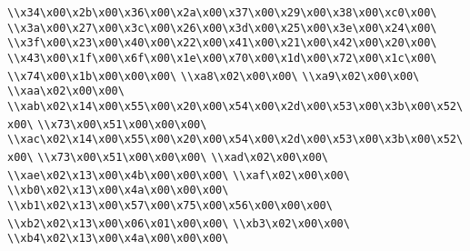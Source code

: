 \verb|\\x34\x00\x2b\x00\x36\x00\x2a\x00\x37\x00\x29\x00\x38\x00\xc0\x00\|\newline
\verb|\\x3a\x00\x27\x00\x3c\x00\x26\x00\x3d\x00\x25\x00\x3e\x00\x24\x00\|\newline
\verb|\\x3f\x00\x23\x00\x40\x00\x22\x00\x41\x00\x21\x00\x42\x00\x20\x00\|\newline
\verb|\\x43\x00\x1f\x00\x6f\x00\x1e\x00\x70\x00\x1d\x00\x72\x00\x1c\x00\|\newline
\verb|\\x74\x00\x1b\x00\x00\x00\|\newline
\verb|\\xa8\x02\x00\x00\|\newline
\verb|\\xa9\x02\x00\x00\|\newline
\verb|\\xaa\x02\x00\x00\|\newline
\verb|\\xab\x02\x14\x00\x55\x00\x20\x00\x54\x00\x2d\x00\x53\x00\x3b\x00\x52\x00\|\newline
\verb|\\x73\x00\x51\x00\x00\x00\|\newline
\verb|\\xac\x02\x14\x00\x55\x00\x20\x00\x54\x00\x2d\x00\x53\x00\x3b\x00\x52\x00\|\newline
\verb|\\x73\x00\x51\x00\x00\x00\|\newline
\verb|\\xad\x02\x00\x00\|\newline
\verb|\\xae\x02\x13\x00\x4b\x00\x00\x00\|\newline
\verb|\\xaf\x02\x00\x00\|\newline
\verb|\\xb0\x02\x13\x00\x4a\x00\x00\x00\|\newline
\verb|\\xb1\x02\x13\x00\x57\x00\x75\x00\x56\x00\x00\x00\|\newline
\verb|\\xb2\x02\x13\x00\x06\x01\x00\x00\|\newline
\verb|\\xb3\x02\x00\x00\|\newline
\verb|\\xb4\x02\x13\x00\x4a\x00\x00\x00\|\newline
